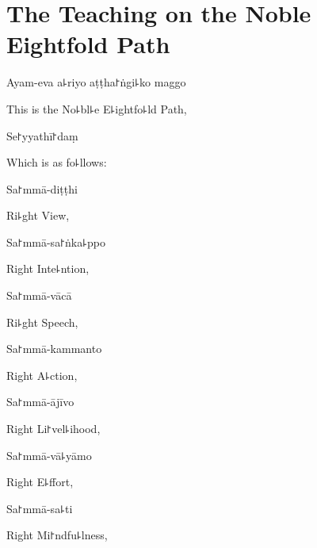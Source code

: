
\chapter[The Noble Eightfold Path]{The Teaching on the Noble Eightfold Path}%


\begin{leader}
\end{leader}

Ayam-eva a꜕riyo aṭṭha꜓ṅgi꜕ko maggo

\begin{english}
  This is the No꜕bl꜕e E꜕ightfo꜕ld Path,
\end{english}

Se꜓yyathī꜓daṃ

\begin{english}
  Which is as fo꜕llows:
\end{english}

Sa꜓mmā-diṭṭhi

\begin{english}
  Ri꜕ght View,
\end{english}

Sa꜓mmā-sa꜓ṅka꜕ppo

\begin{english}
  Right Inte꜕ntion,
\end{english}

Sa꜓mmā-vācā

\begin{english}
  Ri꜕ght Speech,
\end{english}

Sa꜓mmā-kammanto

\begin{english}
  Right A꜕ction,
\end{english}

Sa꜓mmā-ājīvo

\begin{english}
  Right Li꜓vel꜕ihood,
\end{english}

Sa꜓mmā-vā꜕yāmo

\begin{english}
  Right E꜕ffort,
\end{english}

Sa꜓mmā-sa꜕ti

\begin{english}
  Right Mi꜓ndfu꜕lness,
\end{english}

